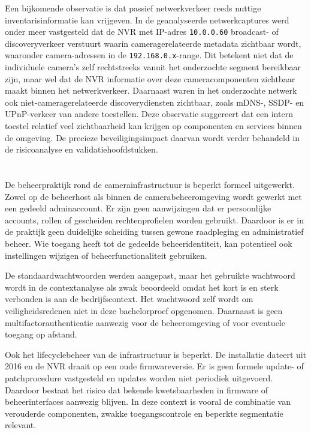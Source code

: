 Een bijkomende observatie is dat passief netwerkverkeer reeds nuttige inventarisinformatie kan vrijgeven. In de geanalyseerde netwerkcaptures werd onder meer vastgesteld dat de NVR met IP-adres \texttt{10.0.0.60} broadcast- of discoveryverkeer verstuurt waarin cameragerelateerde metadata zichtbaar wordt, waaronder camera-adressen in de \texttt{192.168.0.x}-range. Dit betekent niet dat de individuele camera's zelf rechtstreeks vanuit het onderzochte segment bereikbaar zijn, maar wel dat de NVR informatie over deze cameracomponenten zichtbaar maakt binnen het netwerkverkeer. Daarnaast waren in het onderzochte netwerk ook niet-cameragerelateerde discoverydiensten zichtbaar, zoals mDNS-, SSDP- en UPnP-verkeer van andere toestellen. Deze observatie suggereert dat een intern toestel relatief veel zichtbaarheid kan krijgen op componenten en services binnen de omgeving. De precieze beveiligingsimpact daarvan wordt verder behandeld in de risicoanalyse en validatiehoofdstukken.

\section{}%
\label{sec:context-beheerprocessen}

De beheerpraktijk rond de camerainfrastructuur is beperkt formeel uitgewerkt. Zowel op de beheerhost als binnen de camerabeheeromgeving wordt gewerkt met een gedeeld adminaccount. Er zijn geen aanwijzingen dat er persoonlijke accounts, rollen of gescheiden rechtenprofielen worden gebruikt. Daardoor is er in de praktijk geen duidelijke scheiding tussen gewone raadpleging en administratief beheer. Wie toegang heeft tot de gedeelde beheeridentiteit, kan potentieel ook instellingen wijzigen of beheerfunctionaliteit gebruiken.

De standaardwachtwoorden werden aangepast, maar het gebruikte wachtwoord wordt in de contextanalyse als zwak beoordeeld omdat het kort is en sterk verbonden is aan de bedrijfscontext. Het wachtwoord zelf wordt om veiligheidsredenen niet in deze bachelorproef opgenomen. Daarnaast is geen multifactorauthenticatie aanwezig voor de beheeromgeving of voor eventuele toegang op afstand.

Ook het lifecyclebeheer van de infrastructuur is beperkt. De installatie dateert uit 2016 en de NVR draait op een oude firmwareversie. Er is geen formele update- of patchprocedure vastgesteld en updates worden niet periodiek uitgevoerd. Daardoor bestaat het risico dat bekende kwetsbaarheden in firmware of beheerinterfaces aanwezig blijven. In deze context is vooral de combinatie van verouderde componenten, zwakke toegangscontrole en beperkte segmentatie relevant.

